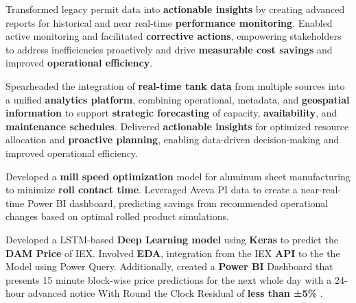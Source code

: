 \documentclass[]{deedy-resume-openfont}
\begin{document}
\begin{minipage}[t]{0.66\textwidth}


\vspace{\topsep}
Transformed legacy permit data into \textbf{actionable insights} by creating advanced reports for historical and near real-time \textbf{performance monitoring}. Enabled active monitoring and facilitated \textbf{corrective actions}, empowering stakeholders to address inefficiencies proactively and drive \textbf{measurable cost savings} and improved \textbf{operational efficiency}.
\sectionsep

\vspace{\topsep}
Spearheaded the integration of \textbf{real-time tank data} from multiple sources into a unified \textbf{analytics platform}, combining operational, metadata, and \textbf{geospatial information} to support \textbf{strategic forecasting} of capacity, \textbf{availability}, and \textbf{maintenance schedules}. Delivered \textbf{actionable insights} for optimized resource allocation and \textbf{proactive planning}, enabling data-driven decision-making and improved operational efficiency.
\sectionsep

\vspace{\topsep}
Developed a \textbf{mill speed optimization} model for aluminum sheet manufacturing to minimize \textbf{roll contact time}. Leveraged Aveva PI data to create a near-real-time Power BI dashboard, predicting savings from recommended operational changes based on optimal rolled product simulations.
\sectionsep

\vspace{\topsep} %
  Developed a LSTM-based \textbf{Deep Learning model} using \textbf{Keras} to predict the \textbf{DAM Price} of IEX. Involved \textbf{EDA}, integration from the IEX \textbf{API} to the the Model using Power Query. Additionally, created a \textbf{Power BI} Dashboard that presents 15 minute block-wise price predictions for the next whole day with a 24-hour advanced notice With Round the Clock Residual of \textbf{less than ±5\%} .


\end{minipage}
\end{document}
